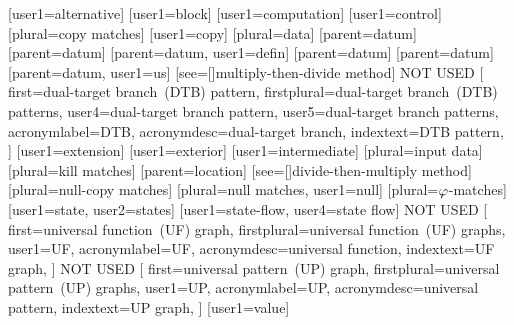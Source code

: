 
[user1={alternative}]
[user1={block}]
[user1={computation}]
[user1={control}]
[plural={copy matches}]
[user1={copy}]
[plural={data}]
[parent={datum}]
[parent={datum}]
[parent={datum}, user1={defin}]
[parent={datum}]
[parent={datum}]
[parent={datum}, user1={us}]
%
        [see=[\seename]{multiply-then-divide method}]
%
           {NOT USED}%
           [%
             first={dual-target branch~(DTB) pattern},
             firstplural={dual-target branch~(DTB) patterns},
             user4={dual-target branch pattern},
             user5={dual-target branch patterns},
             acronymlabel={DTB},
             acronymdesc={dual-target branch},
             indextext={DTB pattern},
           ]
[user1={extension}]
[user1={exterior}]
[user1={intermediate}]
[plural={input data}]
[plural={kill matches}]
[parent={location}]
%
        [see=[\seename]{divide-then-multiply method}]
[plural={null-copy matches}]
[plural={null matches}, user1={null}]
[plural={{}$\varphi$-matches}]
[user1={state}, user2={states}]
[user1={state-flow}, user4={state flow}]
%
           {NOT USED}%
           [%
             first={universal function~(UF) graph},
             firstplural={universal function~(UF) graphs},
             user1={UF},
             acronymlabel={UF},
             acronymdesc={universal function},
             indextext={UF graph},
           ]
%
           {NOT USED}%
           [%
             first={universal pattern~(UP) graph},
             firstplural={universal pattern~(UP) graphs},
             user1={UP},
             acronymlabel={UP},
             acronymdesc={universal pattern},
             indextext={UP graph},
           ]
[user1={value}]


